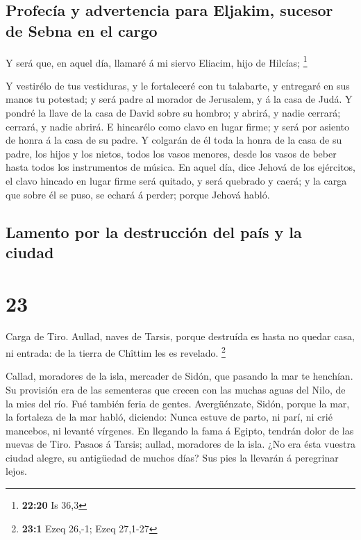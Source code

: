 \hypertarget{profecuxeda-y-advertencia-para-eljakim-sucesor-de-sebna-en-el-cargo}{%
\subsection{Profecía y advertencia para Eljakim, sucesor de Sebna en el
cargo}\label{profecuxeda-y-advertencia-para-eljakim-sucesor-de-sebna-en-el-cargo}}

 Y será que, en aquel día, llamaré á mi siervo Eliacim,
hijo de Hilcías; \footnote{\textbf{22:20} Is 36,3}

 Y vestirélo de tus vestiduras, y le fortaleceré con tu
talabarte, y entregaré en sus manos tu potestad; y será padre al morador
de Jerusalem, y á la casa de Judá.  Y pondré la llave de la
casa de David sobre su hombro; y abrirá, y nadie cerrará; cerrará, y
nadie abrirá.  E hincarélo como clavo en lugar firme; y
será por asiento de honra á la casa de su padre.  Y
colgarán de él toda la honra de la casa de su padre, los hijos y los
nietos, todos los vasos menores, desde los vasos de beber hasta todos
los instrumentos de música.  En aquel día, dice Jehová de
los ejércitos, el clavo hincado en lugar firme será quitado, y será
quebrado y caerá; y la carga que sobre él se puso, se echará á perder;
porque Jehová habló.

\hypertarget{lamento-por-la-destrucciuxf3n-del-pauxeds-y-la-ciudad}{%
\subsection{Lamento por la destrucción del país y la
ciudad}\label{lamento-por-la-destrucciuxf3n-del-pauxeds-y-la-ciudad}}

\hypertarget{section-22}{%
\section{23}\label{section-22}}

 Carga de Tiro. Aullad, naves de Tarsis, porque destruída es
hasta no quedar casa, ni entrada: de la tierra de Chîttim les es
revelado. \footnote{\textbf{23:1} Ezeq 26,-1; Ezeq 27,1-27}

 Callad, moradores de la isla, mercader de Sidón, que
pasando la mar te henchían.  Su provisión era de las
sementeras que crecen con las muchas aguas del Nilo, de la mies del río.
Fué también feria de gentes.  Avergüénzate, Sidón, porque la
mar, la fortaleza de la mar habló, diciendo: Nunca estuve de parto, ni
parí, ni crié mancebos, ni levanté vírgenes.  En llegando la
fama á Egipto, tendrán dolor de las nuevas de Tiro.  Pasaos
á Tarsis; aullad, moradores de la isla.  ¿No era ésta
vuestra ciudad alegre, su antigüedad de muchos días? Sus pies la
llevarán á peregrinar lejos.


